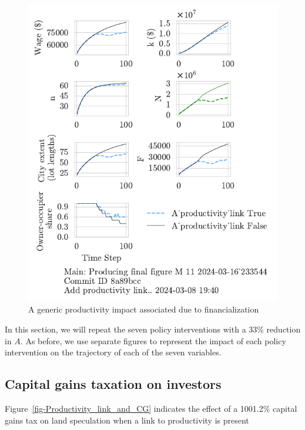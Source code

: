 \begin{figure}[h!tb] 
    \centering
    \includegraphics[scale=1, trim={0 1.4cm .8cm 0},clip]{fig/generic-productivity-impact_233544.pdf} 
    \caption{A generic productivity impact associated due to financialization}
    \label{fig:generic-productivity-impact}
\end{figure}

In this section, we will repeat the seven policy interventions with a 33\% reduction in $A$.  As before, we use separate figures to represent the impact of each policy intervention on the trajectory of each of the seven variables. 


\newpage
\subsection{Capital gains taxation on investors}
Figure~\ref{fig-Productivity_link_and_CG} indicates the effect of a 1001.2\% capital gains tax on land speculation when a link to productivity is present

